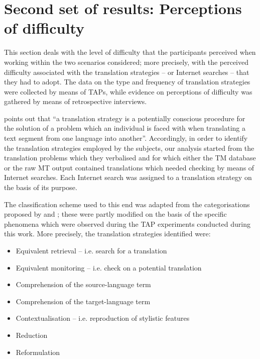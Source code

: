 \documentclass[output=paper]{LSP/langsci}
\begin{document}
\section{Second set of results: Perceptions of difficulty}\label{ressetti-gaspari:sec:5}

This section deals with the level of difficulty that the participants perceived when working within the two scenarios considered; more precisely, with the perceived difficulty associated with the translation strategies -- or Internet searches -- that they had to adopt. The data on the type and frequency of translation strategies were collected by means of TAPs, while evidence on perceptions of difficulty was gathered by means of retrospective interviews.


 points out that ``a translation strategy is a potentially conscious procedure for the solution of a problem which an individual is faced with when translating a text segment from one language into another''. Accordingly, in order to identify the translation strategies employed by the subjects, our analysis started from the translation problems which they verbalised and for which either the TM database or the raw MT output contained translations which needed checking by means of Internet searches. Each Internet search was assigned to a translation strategy on the basis of its purpose.

\largerpage
The classification scheme used to this end was adapted from the categorisations proposed by \citet{Krings1986Translation} and \citet{Gerloff1986}; these were partly modified on the basis of the specific phenomena which were observed during the TAP experiments conducted during this work. More precisely, the translation strategies identified were:
\begin{itemize}
 \item Equivalent retrieval -- i.e. search for a translation
 \item Equivalent monitoring -- i.e. check on a potential translation
 \item Comprehension of the source-language term
 \item Comprehension of the target-language term
 \item Contextualisation -- i.e. reproduction of stylistic features
 \item Reduction
 \item Reformulation
\end{itemize}
\end{document}
